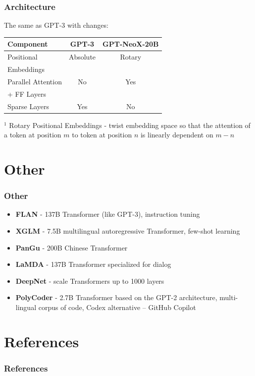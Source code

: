 \documentclass{beamer}
\begin{document}
\begin{frame}
    \frametitle{Architecture}
    The same as GPT-3 with changes:

    \begin{center}
        \begin{tabular}{ l | c | c }
        \textbf{Component} & \textbf{GPT-3} & \textbf{GPT-NeoX-20B} \\
        \hline
        Positional & Absolute & Rotary \\
        Embeddings & & \\
        \hline
        Parallel Attention & No & Yes \\
        + FF Layers & & \\
        \hline
        Sparse Layers & Yes & No \\
        \end{tabular}
    \end{center}

    $^{1}$ Rotary Positional Embeddings \cite{roformer} - twist embedding space so that the attention of a token at position $m$ to token at position $n$ is linearly dependent on $m-n$
\end{frame}



\section{Other}
\begin{frame}
    \frametitle{Other}
    \begin{itemize}
        \item \textbf{FLAN} \cite{flan} - 137B Transformer (like GPT-3), instruction tuning
        \item \textbf{XGLM} \cite{xglm} - 7.5B multilingual autoregressive Transformer, few-shot learning
        \item \textbf{PanGu} \cite{pangu} - 200B Chinese Transformer
        \item \textbf{LaMDA} \cite{lamda} - 137B Transformer specialized for dialog
        \item \textbf{DeepNet} \cite{deepnet} - scale Transformers up to 1000 layers
        \item \textbf{PolyCoder} \cite{polycoder} - 2.7B Transformer based on the GPT-2 architecture, multi-lingual corpus of code, Codex alternative -- GitHub Copilot
    \end{itemize}
\end{frame}


\section{References}
\begin{frame}[allowframebreaks,t]
    \tiny
    \frametitle{References}
    
    
\end{frame}
\end{document}

